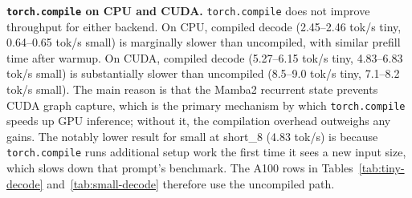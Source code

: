 \textbf{\texttt{torch.compile} on CPU and CUDA.}
\label{sec:discussion-compile}
\texttt{torch.compile} does not improve throughput for either backend. On CPU, compiled decode (2.45--2.46 tok/s tiny, 0.64--0.65 tok/s small) is marginally slower than uncompiled, with similar prefill time after warmup. On CUDA, compiled decode (5.27--6.15 tok/s tiny, 4.83--6.83 tok/s small) is substantially slower than uncompiled (8.5--9.0 tok/s tiny, 7.1--8.2 tok/s small). The main reason is that the Mamba2 recurrent state prevents CUDA graph capture, which is the primary mechanism by which \texttt{torch.compile} speeds up GPU inference; without it, the compilation overhead outweighs any gains. The notably lower result for small at short\_8 (4.83 tok/s) is because \texttt{torch.compile} runs additional setup work the first time it sees a new input size, which slows down that prompt's benchmark. The A100 rows in Tables~\ref{tab:tiny-decode} and~\ref{tab:small-decode} therefore use the uncompiled path.

